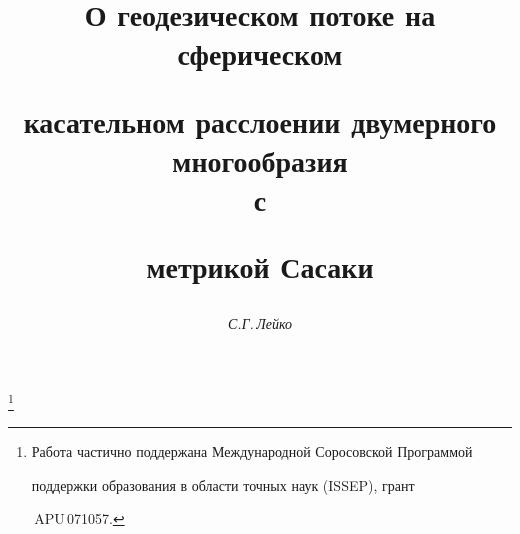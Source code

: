 

 


%  


\newcommand{\const}{\operatorname{const}} 


\newcommand{\sgrad}{\operatorname{sgrad}} 


\newcommand{\tts}[1]{} 


 




 


\setcounter{page}{33} 












 


\author{\it С.Г.\,Лейко} 




\title{О геодезическом потоке на сферическом  


касательном расслоении двумерного многообразия\\ с  


метрикой Сасаки} 


\thanks{Работа частично поддержана Международной Соросовской Программой  


поддержки образования в области точных наук (ISSEP), грант 


\No\,APU\,071057.} 


 


\date{} 




\pagestyle{plain} %


